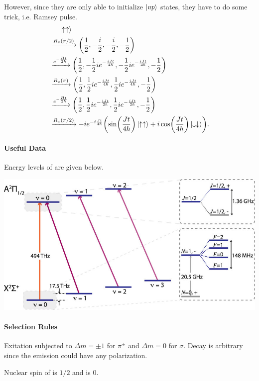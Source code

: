 \documentclass{article}
\begin{document}
\begin{enumerate}
    However, since they are only able to initialize $\ket{up}$ states, they have to do some trick, i.e. Ramsey pulse.
    \begin{align*}
        &\phantom{{}={}} \ket{\uparrow\uparrow} \\
        & \xrightarrow{R_x(\pi/2)} \qty(\frac{1}{2},-\frac{i}{2},-\frac{i}{2},-\frac{1}{2}) \\
        & \xrightarrow{e^{-\frac{Ht}{2\hbar}}} \qty(\frac{1}{2},-\frac{1}{2} i e^{-\frac{i J t}{4 \hbar}},-\frac{1}{2} i e^{-\frac{i J t}{4 \hbar}},-\frac{1}{2}) \\
        & \xrightarrow{R_x(\pi)} \qty(\frac{1}{2},\frac{1}{2} i e^{-\frac{i J t}{4 \hbar}},\frac{1}{2} i e^{-\frac{i J t}{4 \hbar}},-\frac{1}{2}) \\
        & \xrightarrow{e^{-\frac{Ht}{2\hbar}}} \qty(\frac{1}{2},\frac{1}{2} i e^{-\frac{i J t}{2 \hbar}},\frac{1}{2} i e^{-\frac{i J t}{2 \hbar}},-\frac{1}{2}) \\
        & \xrightarrow{R_x(\pi/2)} -i e^{-i\frac{Jt}{4\hbar}}\qty(\sin(\frac{Jt}{4\hbar})\ket{\uparrow\uparrow} + i\cos (\frac{Jt}{4\hbar})\ket{\downarrow\downarrow}).
    \end{align*}
\end{enumerate}

\paragraph*{Useful Data}
Energy levels of  are given below.
\begin{center}
    \includegraphics{img/Levels.png}
\end{center}

\paragraph*{Selection Rules}
Exitation subjected to $\Delta m = \pm 1$ for $\pi^\pm$ and $\Delta m = 0$ for $\sigma$.
Decay is arbitrary since the emission could have any polarization.
\par
Nuclear spin of  is $1/2$ and  is $0$.
\end{document}
